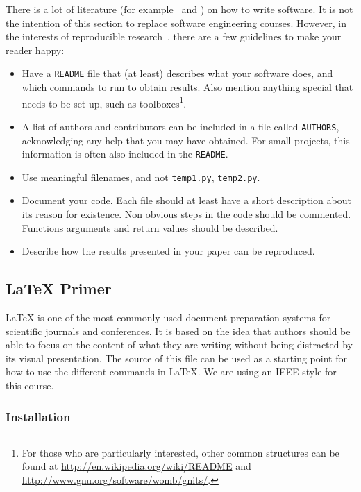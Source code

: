 \documentclass[10pt,conference,compsocconf]{IEEEtran}
\begin{document}
There is a lot of literature (for example~\cite{hunt99pragmatic} and
\cite{spolsky04software}) on how to write software. It is not the
intention of this section to replace software engineering
courses. However, in the interests of reproducible
research~\cite{schwab00}, there are a few guidelines to make your
reader happy:
\begin{itemize}
\item Have a \texttt{README} file that (at least) describes what your
  software does, and which commands to run to obtain results. Also
  mention anything special that needs to be set up, such as
  toolboxes\footnote{For those who are
  particularly interested, other common structures can be found at
  \url{http://en.wikipedia.org/wiki/README} and
  \url{http://www.gnu.org/software/womb/gnits/}.}.
\item A list of authors and contributors can be included in a file
  called \texttt{AUTHORS}, acknowledging any help that you may have
  obtained. For small projects, this information is often also
  included in the \texttt{README}.
\item Use meaningful filenames, and not \texttt{temp1.py},
  \texttt{temp2.py}. 
\item Document your code. Each file should at least have a short
  description about its reason for existence. Non obvious steps in the
  code should be commented. Functions arguments and return values should be described.
\item Describe how the results presented in your paper can be reproduced.
\end{itemize}


\subsection{\LaTeX{} Primer}
\label{sec:latex-primer}

\LaTeX{} is one of the most commonly used document preparation systems
for scientific journals and conferences. It is based on the idea
that authors should be able to focus on the content of what they are
writing without being distracted by its visual presentation.
The source of this file can be used as a starting point for how to use
the different commands in \LaTeX{}. We are using an IEEE style for
this course.

\subsubsection{Installation}
\end{document}
